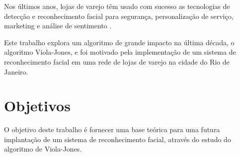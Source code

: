 Nos últimos anos, lojas de varejo têm usado com sucesso as tecnologias de detecção e reconhecimento facial para segurança, personalização de serviço, marketing e análise de sentimento \cite{fortune2015walmart} \cite{exame2018pontofrio} \cite{2017recfacial}.

Este trabalho explora um algoritmo de grande impacto na última década, o algoritmo Viola-Jones, e foi motivado pela implementação de um sistema de reconhecimento facial em uma rede de lojas de varejo na cidade do Rio de Janeiro.

\section{Objetivos}\label{sec:objetivos}

O objetivo deste trabalho é fornecer uma base teórica para uma futura implantação de um sistema de reconhecimento facial, através do estudo do algoritmo de Viola-Jones.
